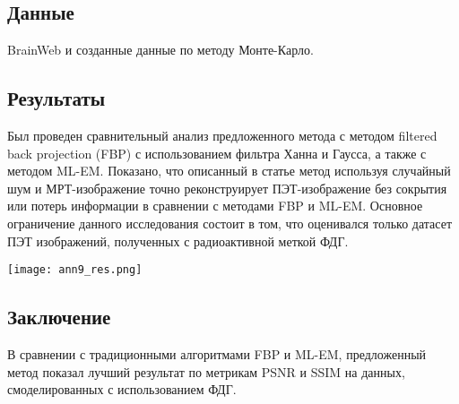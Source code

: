 \subsection*{Данные} BrainWeb и созданные данные по методу Монте-Карло.
\subsection*{Результаты}
Был проведен сравнительный анализ предложенного метода
с методом filtered back projection (FBP) с использованием фильтра 
Ханна и Гаусса, а также с методом ML-EM. Показано, что описанный в статье метод
используя случайный шум и МРТ-изображение точно реконструирует ПЭТ-изображение 
без сокрытия или потерь информации в сравнении с методами FBP и ML-EM.
Основное ограничение данного исследования состоит в том, что оценивался 
только датасет ПЭТ изображений, полученных с радиоактивной меткой ФДГ.

\begin{minipage}{1.0\linewidth}
    \begin{center}
        \texttt{[image: ann9\_res.png]} \\
        \caption{\scriptsize{Количественные результаты реконструированных
        изображений по метрике PSNR(слева) и SSIM(справа) относительно различных алгоритмов.
        Линия внутри прямоугольника представляет медиану, верхние и нижние линии прямоугольника - 
        75-й и 25-й перцентили соответственно. Верхние и нижние \glqq антенны\grqq представляют максимум и минимум соответственно.
        }}
    \end{center}
    
\end{minipage}
\subsection*{Заключение}
В сравнении с традиционными алгоритмами FBP и ML-EM, предложенный
метод показал лучший результат по метрикам PSNR и SSIM на данных, смоделированных с
использованием ФДГ.